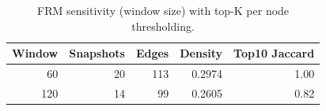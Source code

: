 \begin{table}[ht]
\centering
\small
\begin{tabular}{r r r r r}
\hline
Window & Snapshots & Edges & Density & Top10 Jaccard \\
\hline
60 & 20 & 113 & 0.2974 & 1.00 \\
120 & 14 & 99 & 0.2605 & 0.82 \\
\hline
\end{tabular}
\caption{FRM sensitivity (window size) with top-K per node thresholding.}
\label{tab:frm_sensitivity}
\end{table}
